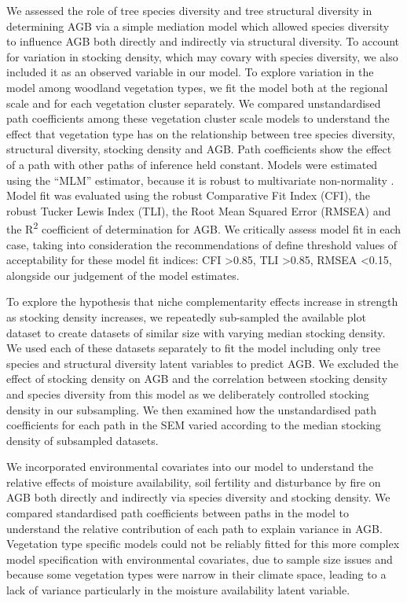 \documentclass[11pt,a4paper]{article}
\begin{document}
We assessed the role of tree species diversity and tree structural diversity in determining AGB via a simple mediation model which allowed species diversity to influence AGB both directly and indirectly via structural diversity. To account for variation in stocking density, which may covary with species diversity, we also included it as an observed variable in our model. To explore variation in the model among woodland vegetation types, we fit the model both at the regional scale and for each vegetation cluster separately. We compared unstandardised path coefficients among these vegetation cluster scale models to understand the effect that vegetation type has on the relationship between tree species diversity, structural diversity, stocking density and AGB. Path coefficients show the effect of a path with other paths of inference held constant. Models were estimated using the ``MLM'' estimator, because it is robust to multivariate non-normality \citep{Shapiro1983}. Model fit was evaluated using the robust Comparative Fit Index (CFI), the robust Tucker Lewis Index (TLI), the Root Mean Squared Error  (RMSEA) and the R\textsuperscript{2} coefficient of determination for AGB. We critically assess model fit in each case, taking into consideration the recommendations of \citet{Hu1999}  define threshold values of acceptability for these model fit indices: CFI >0.85, TLI >0.85, RMSEA <0.15, alongside our judgement of the model estimates.

To explore the hypothesis that niche complementarity effects increase in strength as stocking density increases, we repeatedly sub-sampled the available plot dataset to create \subn{} datasets of similar size with varying median stocking density. We used each of these datasets separately to fit the model including only tree species and structural diversity latent variables to predict AGB. We excluded the effect of stocking density on AGB and the correlation between stocking density and species diversity from this model as we deliberately controlled stocking density in our subsampling. We then examined how the unstandardised path coefficients for each path in the SEM varied according to the median stocking density of subsampled datasets.

We incorporated environmental covariates into our model to understand the relative effects of moisture availability, soil fertility and disturbance by fire on AGB both directly and indirectly via species diversity and stocking density. We compared standardised path coefficients between paths in the model to understand the relative contribution of each path to explain variance in AGB. Vegetation type specific models could not be reliably fitted for this more complex model specification with environmental covariates, due to sample size issues and because some vegetation types were narrow in their climate space, leading to a lack of variance particularly in the moisture availability latent variable.
\end{document}
